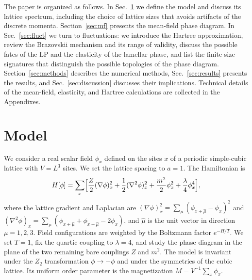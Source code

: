 \documentclass[aps,prd,twocolumn,superscriptaddress,nofootinbib,10pt]{revtex4-2}
\begin{document}
The paper is organized as follows.  In Sec.~\ref{sec:model} we define the
model and discuss its lattice spectrum, including the choice of lattice sizes
that avoids artifacts of the discrete momenta.  Section~\ref{sec:mf} presents
the mean-field phase diagram.  In Sec.~\ref{sec:fluct} we turn to
fluctuations: we introduce the Hartree approximation, review the Brazovskii
mechanism and its range of validity, discuss the possible fates of the LP and
the elasticity of the lamellar phase, and list the finite-size signatures that
distinguish the possible topologies of the phase diagram.
Section~\ref{sec:methods} describes the numerical methods,
Sec.~\ref{sec:results} presents the results, and
Sec.~\ref{sec:discussion} discusses their implications.  Technical details of
the mean-field, elasticity, and Hartree calculations are collected in the
Appendixes.

\section{Model}
\label{sec:model}

We consider a real scalar field $\phi_x$ defined on the sites $x$ of a
periodic simple-cubic lattice with $V=L^3$ sites.  We set the lattice spacing
to $a=1$.  The Hamiltonian is
\begin{equation}
 H[\phi]=\sum_x\Bigl[\frac{Z}{2}(\nabla\phi)_x^2+\frac12(\nabla^2\phi)_x^2
 +\frac{m^2}{2}\phi_x^2+\frac{\lambda}{4}\phi_x^4\Bigr],
 \label{eq:H}
\end{equation}
where the lattice gradient and Laplacian are
$(\nabla\phi)_x^2=\sum_\mu(\phi_{x+\hat\mu}-\phi_x)^2$ and
$(\nabla^2\phi)_x=\sum_\mu(\phi_{x+\hat\mu}+\phi_{x-\hat\mu}-2\phi_x)$, and
$\hat\mu$ is the unit vector in direction $\mu=1,2,3$.  Field configurations
are weighted by the Boltzmann factor $e^{-H/T}$.  We set $T=1$, fix the
quartic coupling to $\lambda=4$, and study the phase diagram in the plane of
the two remaining bare couplings $Z$ and $m^2$.  The model is invariant under
the $Z_2$ transformation $\phi\to-\phi$ and under the symmetries of the cubic
lattice.  Its uniform order parameter is the magnetization
$M=V^{-1}\sum_x\phi_x$.
\end{document}
